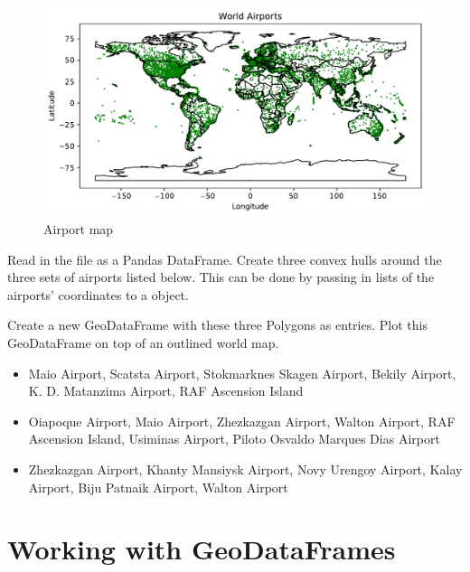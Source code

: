 \begin{figure}[H]
\begin{center}
\includegraphics[scale=.6]{figures/airports.pdf}
\end{center}
\label{airport-map}
\caption{Airport map}
\end{figure}

\begin{problem}
Read in the file  as a Pandas DataFrame.
Create three convex hulls around the three sets of airports listed below.
This can be done by passing in lists of the airports' coordinates to a  object.

Create a new GeoDataFrame with these three Polygons as entries.
Plot this GeoDataFrame on top of an outlined world map.
\begin{itemize} %
	\item Maio Airport, Scatsta Airport, Stokmarknes Skagen Airport, Bekily Airport, K. D. Matanzima Airport, RAF Ascension Island
	\item Oiapoque Airport, Maio Airport, Zhezkazgan Airport, Walton Airport, RAF Ascension Island, Usiminas Airport, Piloto Osvaldo Marques Dias Airport
	\item Zhezkazgan Airport, Khanty Mansiysk Airport, Novy Urengoy Airport, Kalay Airport, Biju Patnaik Airport, Walton Airport
\end{itemize}
\end{problem}

\section*{Working with GeoDataFrames} %

